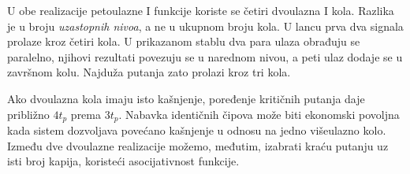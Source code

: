 
U obe realizacije petoulazne I funkcije koriste se četiri dvoulazna I kola. Razlika je u broju \emph{uzastopnih nivoa}, a ne u ukupnom broju kola. U lancu prva dva signala prolaze kroz četiri kola. U prikazanom stablu dva para ulaza obrađuju se paralelno, njihovi rezultati povezuju se u narednom nivou, a peti ulaz dodaje se u završnom kolu. Najduža putanja zato prolazi kroz tri kola.

Ako dvoulazna kola imaju isto kašnjenje, poređenje kritičnih putanja daje približno \(4t_p\) prema \(3t_p\). Nabavka identičnih čipova može biti ekonomski povoljna kada sistem dozvoljava povećano kašnjenje u odnosu na jedno višeulazno kolo. Između dve dvoulazne realizacije možemo, međutim, izabrati kraću putanju uz isti broj kapija, koristeći asocijativnost funkcije.
